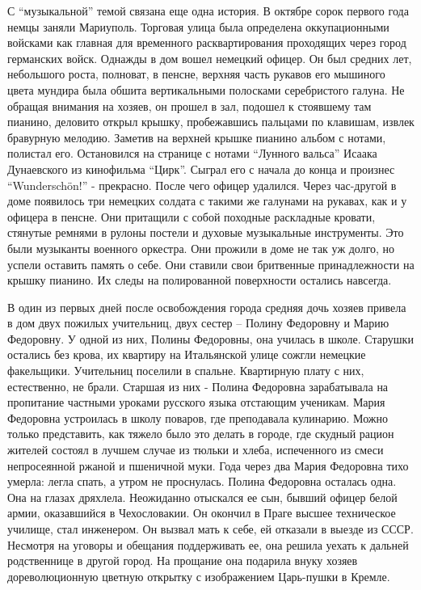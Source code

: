 С \enquote{музыкальной} темой связана еще одна история. В октябре сорок первого
года немцы заняли Мариуполь. Торговая улица была определена оккупационными
войсками как главная для временного расквартирования проходящих через город
германских войск. Однажды в дом вошел немецкий офицер. Он был средних лет,
небольшого роста, полноват, в пенсне, верхняя часть рукавов его мышиного цвета
мундира была обшита вертикальными полосками серебристого галуна. Не обращая
внимания на хозяев, он прошел в зал, подошел к стоявшему там пианино, деловито
открыл крышку, пробежавшись пальцами по клавишам, извлек бравурную мелодию.
Заметив на верхней крышке пианино альбом с нотами, полистал его. Остановился на
странице с нотами \enquote{Лунного вальса} Исаака Дунаевского из кинофильма
\enquote{Цирк}. Сыграл его с начала до конца и произнес \enquote{Wunderschön!}
- прекрасно. После чего офицер удалился. Через час-другой в доме появилось три
немецких солдата с такими же галунами на рукавах, как и у офицера в пенсне. Они
притащили с собой походные раскладные кровати, стянутые ремнями в рулоны
постели и духовые музыкальные инструменты. Это были музыканты военного
оркестра. Они прожили в доме не так уж долго, но успели оставить память о себе.
Они ставили свои бритвенные принадлежности на крышку пианино. Их следы на
полированной поверхности остались навсегда.

В один из первых дней после освобождения города средняя дочь хозяев привела в
дом двух пожилых учительниц, двух сестер – Полину Федоровну и Марию Федоровну.
У одной из них,  Полины Федоровны, она училась в школе. Старушки остались без
крова, их квартиру на Итальянской улице сожгли немецкие факельщики. Учительниц
поселили в спальне. Квартирную плату с них, естественно, не брали. Старшая из
них - Полина Федоровна зарабатывала на пропитание частными уроками русского
языка отстающим ученикам. Мария Федоровна устроилась в школу поваров, где
преподавала кулинарию. Можно только представить, как тяжело было это делать в
городе, где скудный рацион жителей состоял в лучшем случае из тюльки и хлеба,
испеченного из смеси непросеянной ржаной и пшеничной муки. Года через два Мария
Федоровна тихо умерла: легла спать, а утром не проснулась. Полина Федоровна
осталась одна. Она на глазах дряхлела. Неожиданно отыскался ее сын, бывший
офицер белой армии, оказавшийся в Чехословакии. Он окончил в Праге высшее
техническое училище, стал инженером. Он вызвал мать к себе, ей отказали в
выезде из СССР. Несмотря на уговоры и обещания поддерживать ее, она решила
уехать к дальней родственнице в другой город. На прощание она подарила внуку
хозяев дореволюционную цветную открытку с изображением Царь-пушки в Кремле.

